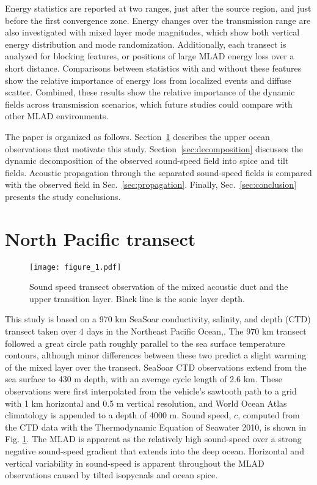 \documentclass[preprint,NumberedRefs]{JASA}
\begin{document}
Energy statistics are reported at two ranges, just after the source region, and just before the first convergence zone. Energy changes over the transmission range are also investigated with mixed layer mode magnitudes, which show both vertical energy distribution and mode randomization. Additionally, each transect is analyzed for blocking features,\citep{colosi2020observations} or positions of large MLAD energy loss over a short distance. Comparisons between statistics with and without these features show the relative importance of energy loss from localized events and diffuse scatter. Combined, these results show the relative importance of the dynamic fields across transmission scenarios, which future studies could compare with other MLAD environments.

The paper is organized as follows. Section~\ref{sec:transcet} describes the upper ocean observations that motivate this study. Section~\ref{sec:decomposition} discusses the dynamic decomposition of the observed sound-speed field into spice and tilt fields. Acoustic propagation through the separated sound-speed fields is compared with the observed field in Sec.~\ref{sec:propagation}. Finally, Sec.~\ref{sec:conclusion} presents the study conclusions.

\section{North Pacific transect}\label{sec:transcet}
\begin{figure}
\texttt{[image: figure\_1.pdf]}
\caption{\label{fig:c_grid}{Sound speed transect observation of the mixed acoustic duct and the upper transition layer. Black line is the sonic layer depth.}}
\end{figure}

This study is based on a 970 km SeaSoar conductivity, salinity, and depth (CTD) transect taken over 4 days in the Northeast Pacific Ocean,\citep{cole2010seasonal, colosi2020observations}. The 970 km transect followed a great circle path roughly parallel to the sea surface temperature contours, although minor differences between these two predict a slight warming of the mixed layer over the transect. SeaSoar CTD observations extend from the sea surface to 430 m depth, with an average cycle length of 2.6 km. These observations were first interpolated from the vehicle's sawtooth path to a grid with 1 km horizontal and 0.5 m vertical resolution,\citep{colosi2020observations} and World Ocean Atlas climatology is appended to a depth of 4000 m\citep{WOA}. Sound speed, $c$, computed from the CTD data with the Thermodynamic Equation of Seawater 2010,\cite{TEOS10} is shown in Fig. \ref{fig:c_grid}. The MLAD is apparent as the relatively high sound-speed over a strong negative sound-speed gradient that extends into the deep ocean. Horizontal and vertical variability in sound-speed is apparent throughout the MLAD observations caused by tilted isopycnals and ocean spice\citep{colosi2020observations}.
\end{document}
